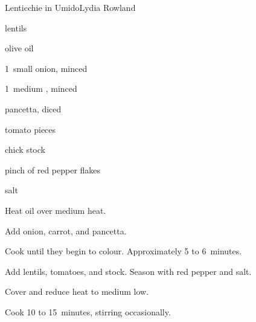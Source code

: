 \begin{recipe}{Lenticchie in Umido}{Lydia Rowland}{}

\begin{ingredients}
\item {} lentils
\item \C{\third} olive oil
\item 1~small onion, minced
\item 1~medium , minced
\item {} pancetta, diced
\item {} tomato pieces
\item {} chick stock
\item pinch of red pepper flakes
\item salt
\end{ingredients}

\begin{directions}
\item Heat oil over medium heat.
\item Add onion, carrot, and pancetta.
\item Cook until they begin to colour. Approximately 5 to 6~minutes.
\item Add lentils, tomatoes, and stock. Season with red pepper and salt.
\item Cover and reduce heat to medium low.
\item Cook 10 to 15~minutes, stirring occasionally.
\end{directions}

\end{recipe}
